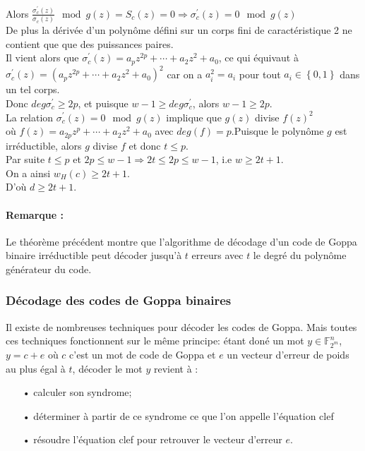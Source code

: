 \documentclass[12pt,openany]{report}
\begin{document}
    Alors $\frac{\sigma_c^{'}(z)}{\sigma_c(z)} \mod g(z)=\mathit{S}_c(z)=0 \Longrightarrow \sigma_c^{'}(z)=0 \mod g(z) $\\
    De plus la dérivée d'un polynôme défini sur un corps fini de caractéristique 2 ne contient que que des puissances paires.\\
    Il vient alors que $ \sigma_c^{'}(z)=a_pz^{2p}+ \cdots +a_2z^2+a_0 $, ce qui équivaut à $\sigma_c^{'}(z)=(a_pz^{2p}+ \cdots +a_2z^2+a_0)^2 $ car on a $a_i^2=a_i $ pour tout $ a_i \in \left\lbrace 0,1\right\rbrace $ dans un tel corps.\\
    Donc $deg \sigma_c^{'} \geq 2p $, et puisque $w-1 \geq deg \sigma_c^{'} $, alors $w-1 \geq 2p. $\\
    La relation $ \sigma_c^{'}(z)=0 \mod g(z) $ implique que $g(z) $ divise $f(z)^2 $\\
    où $ f(z)=a_{2p}z^{p}+ \cdots +a_2z^2+a_0  $ avec $ deg(f)=p$.Puisque le polynôme $g$ est irréductible, alors $g$ divise $f$ et donc $ t \leq p $.\\
    Par suite $ t \leq p $ et $2p \leq w-1 \Longrightarrow 2t \leq 2p \leq w-1 $, i.e $w \geq 2t +1.   $\\
    On a ainsi $ w_H(c)\geq 2t +1  $.\\ D'où $ d\geq 2t +1. $
    \paragraph{Remarque :\\} Le théorème précédent montre que l'algorithme de décodage d'un code de Goppa binaire irréductible peut décoder jusqu'à $t$ erreurs avec $t$ le degré du polynôme générateur du code.
    
 \subsubsection{Décodage des codes de Goppa binaires}
 Il existe de nombreuses techniques pour décoder les codes de Goppa. Mais toutes ces techniques fonctionnent sur le même principe: 
 étant doné un mot $y \in \mathbb{F}_{2^m}^n$,
 $y=c +e$ où $c$ c'est un mot de code de Goppa et $e$ un vecteur d'erreur de poids au plus égal à $t$, décoder le mot $y$ revient à :
 \begin{itemize}
 \item[•] calculer son syndrome;
 \item[•] déterminer à partir de ce syndrome ce que l'on appelle l'équation clef
 \item[•] résoudre l'équation clef pour retrouver le vecteur d'erreur $e$.
 \end{itemize}
\end{document}
